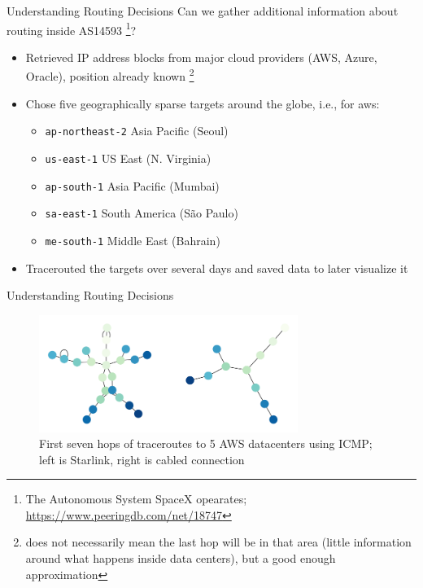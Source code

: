\documentclass[NET,english,beameralt]{tumbeamer}
\begin{document}
\begin{frame}{Understanding Routing Decisions}
    Can we gather additional information about routing inside AS14593 
        \footnote{The Autonomous System SpaceX opearates; \url{https://www.peeringdb.com/net/18747}}?
    \begin{itemize}
        \item Retrieved IP address blocks from major cloud providers (AWS, Azure, Oracle), position already known
            \footnote{does not necessarily mean the last hop will be in that area (little information around what happens inside data centers), 
                        but a good enough approximation}
        \item Chose five geographically sparse targets around the globe, i.e., for aws:
            \begin{itemize}
                \item \texttt{ap-northeast-2} Asia Pacific (Seoul)
                \item \texttt{us-east-1} US East (N. Virginia)
                \item \texttt{ap-south-1} Asia Pacific (Mumbai)
                \item \texttt{sa-east-1} South America (São Paulo)
                \item \texttt{me-south-1} Middle East (Bahrain)
            \end{itemize}
        \item Tracerouted the targets over several days and saved data to later visualize it
    \end{itemize}
\end{frame}

\begin{frame}{Understanding Routing Decisions}
    \begin{figure}
        \includegraphics[width=0.75\textwidth]{pics/aws_7_icmp.png}
        \caption{First seven hops of traceroutes to 5 AWS datacenters using ICMP; left is Starlink, right is cabled connection}
    \end{figure}
\end{frame}
\end{document}
